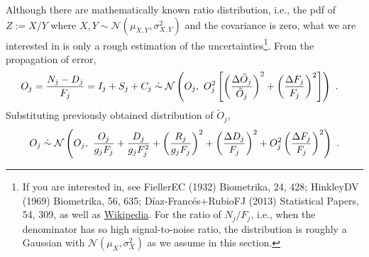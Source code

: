 Although there are mathematically known ratio distribution, i.e., the pdf of $ Z := X/Y $ where $ X, Y \sim \mathcal{N}(\mu_{X, Y}, \sigma_{X, Y}^2) $ and the covariance is zero, what we are interested in is only a rough estimation of the uncertainties\footnote{If you are interested in, see FiellerEC (1932) Biometrika, 24, 428; HinkleyDV (1969) Biometrika, 56, 635;  D\'{i}az-Franc\'{e}s+RubioFJ (2013) Statistical Papers, 54, 309, as well as \href{https://en.wikipedia.org/wiki/Ratio_distribution}{Wikipedia}. For the ratio of $ N_j/F_j $, i.e., when the denominator has so high signal-to-noise ratio, the distribution is roughly a Gaussian with $ \mathcal{N}(\mu_X, \sigma_X^2) $ as we assume in this section.}. From the propagation of error, 
\begin{equation}
\begin{aligned}
  O_j = \frac{N_j - D_j}{F_j} = I_j + S_j + C_j
    &\mathrel{\dot{\sim}} \mathcal{N} 
      \left ( O_j,~ 
        O_j^2 \left [ 
        \left (\frac{\Delta \tilde{O}_j}{\tilde{O}_j} \right )^2 
        + \left (\frac{\Delta F_j}{F_j} \right )^2 \right ] \right ) ~.
\end{aligned}
\end{equation}
Substituting previously obtained distribution of $ \tilde{O}_j $,
\begin{equation}
  O_j 
    \mathrel{\dot{\sim}} \mathcal{N} 
      \left ( O_j,~ 
        \frac{O_j}{g_jF_j} 
        + \frac{D_j}{g_j F_j^2} 
        + \left (\frac{R_j}{g_j F_j} \right )^2 
        + \left  (\frac{\Delta D_j}{F_j} \right )^2
        + O_j^2 \left (\frac{\Delta F_j}{F_j} \right )^2
        \right ) ~.
\end{equation}



